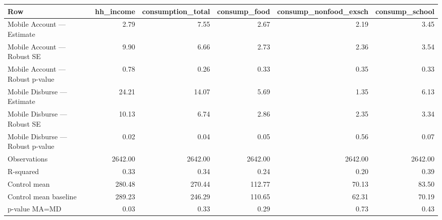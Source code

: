 
\begin{tabular}{lrrrrr}
\toprule
Row & hh\_income & consumption\_total & consump\_food & consump\_nonfood\_exsch & consump\_school\\
\midrule
Mobile Account — Estimate & 2.79 & 7.55 & 2.67 & 2.19 & 3.45\\
Mobile Account — Robust SE & 9.90 & 6.66 & 2.73 & 2.36 & 3.54\\
Mobile Account — Robust p-value & 0.78 & 0.26 & 0.33 & 0.35 & 0.33\\
Mobile Disburse — Estimate & 24.21 & 14.07 & 5.69 & 1.35 & 6.13\\
Mobile Disburse — Robust SE & 10.13 & 6.74 & 2.86 & 2.35 & 3.34\\
\addlinespace
Mobile Disburse — Robust p-value & 0.02 & 0.04 & 0.05 & 0.56 & 0.07\\
Observations & 2642.00 & 2642.00 & 2642.00 & 2642.00 & 2642.00\\
R-squared & 0.33 & 0.34 & 0.24 & 0.20 & 0.39\\
Control mean & 280.48 & 270.44 & 112.77 & 70.13 & 83.50\\
Control mean baseline & 289.23 & 246.29 & 110.65 & 62.31 & 70.19\\
\addlinespace
p-value MA=MD & 0.03 & 0.33 & 0.29 & 0.73 & 0.43\\
\bottomrule
\end{tabular}
